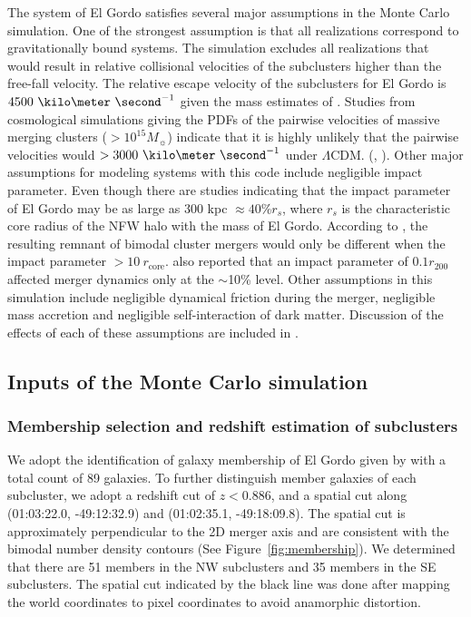 The system of El Gordo satisfies several major assumptions in the Monte Carlo
simulation.
One of the strongest assumption is that all realizations correspond to
gravitationally bound systems. The simulation excludes all realizations
that would result in relative collisional velocities of the subclusters
higher than the free-fall velocity. The relative escape velocity of the
subclusters for El Gordo is $4500~\kilo\meter~\second^{-1}$ given
the mass estimates of \cite{Jee13} .  
Studies from cosmological simulations giving the PDFs of the pairwise velocities of massive merging clusters ($>
10^{15} M_{\sun}$) indicate that it is highly unlikely that the pairwise
velocities would $> 3000~\kilo \meter~\second^{-1}$ under $\Lambda$CDM.
(\citealt{Thompson12}, \citealt{Lee2010}).  Other major assumptions for
modeling systems with this code include negligible impact parameter. Even
though there are studies indicating that the impact parameter of El Gordo
may be as large as $300$ kpc $ \approx 40\% r_s$\citep{Molnar14},
where $r_s$ is the characteristic core
radius of the NFW halo with the mass of El Gordo. According to
\cite{Ricker98}, the resulting remnant of bimodal cluster mergers would only be
different when the impact parameter $> 10~ r_{\text{core}}$.
\cite{Mastropietro2008a} also reported that an impact parameter of $0.1
r_{200}$ affected merger dynamics only at the $\sim$10\% level.   
Other assumptions in this simulation include negligible dynamical friction
during the merger, negligible mass accretion and negligible self-interaction
of dark matter. Discussion of the effects of each of these assumptions are
included in .  
\par

\subsection{Inputs of the Monte Carlo simulation} \label{sec: inputs}
\setcounter{table}{0} 



\subsubsection{Membership selection and redshift estimation of subclusters}
%
We adopt the identification of galaxy membership of El Gordo given by
 with a total count of 89 galaxies.
To further distinguish member galaxies of each subcluster, we adopt a
redshift cut of $z < 0.886$, and a spatial cut along (01:03:22.0,
-49:12:32.9) and (01:02:35.1, -49:18:09.8). The spatial cut is approximately perpendicular
to the 2D merger axis and are consistent with the bimodal number density
contours (See Figure~\ref{fig:membership}). We determined that
there are 51 members in the NW subclusters and 35 members in the SE
subclusters. 
The spatial cut indicated by the black line was done after
mapping the world coordinates to pixel coordinates to avoid anamorphic
distortion.  

